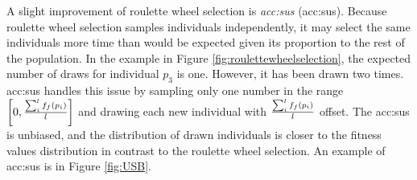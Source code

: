 A slight improvement of roulette wheel selection is \emph{\acrlong*{acc:sus}} (\acrshort{acc:sus}). Because roulette wheel selection samples individuals independently, it may select the same individuals more time than would be expected given its proportion to the rest of the population. In the example in Figure \ref{fig:roulettewheelselection}, the expected number of draws for individual $p_3$ is one. However, it has been drawn two times. \acrlong{acc:sus} handles this issue by sampling only one number in the range $\left[0,\frac{\sum_i^lf_f(p_i)}{l} \right]$ and drawing each new individual with $\frac{\sum_i^lf_f(p_i)}{l}$ offset. The \acrshort{acc:sus} is unbiased, and the distribution of drawn individuals is closer to the fitness values distribution in contrast to the roulette wheel selection. An example of \acrshort{acc:sus} is in Figure \ref{fig:USB}.

